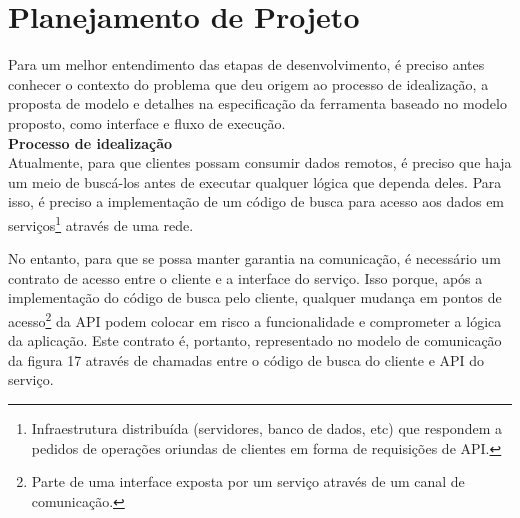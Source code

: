 \section{Planejamento de Projeto}

Para um melhor entendimento das etapas de desenvolvimento, é preciso antes conhecer o contexto do problema que deu origem ao processo de idealização, a proposta de modelo e detalhes na especificação da ferramenta baseado no modelo proposto, como interface e fluxo de execução. \\

\textbf{Processo de idealização} \\

Atualmente, para que clientes possam consumir dados remotos, é preciso que haja um meio de buscá-los antes de executar qualquer lógica que dependa deles. Para isso, é preciso a implementação de um código de busca para acesso aos dados em serviços\footnote{
  Infraestrutura distribuída (servidores, banco de dados, etc) que respondem a pedidos de operações oriundas de clientes em forma de requisições de API.
} através de uma rede.

No entanto, para que se possa manter garantia na comunicação, é necessário um contrato de acesso entre o cliente e a interface do serviço. Isso porque, após a implementação do código de busca pelo cliente, qualquer mudança em pontos de acesso\footnote{
  Parte de uma interface exposta por um serviço através de um canal de comunicação.
} da API podem colocar em risco a funcionalidade e comprometer a lógica da aplicação. Este contrato é, portanto, representado no modelo de comunicação da figura 17 através de chamadas entre o código de busca do cliente e API do serviço.

